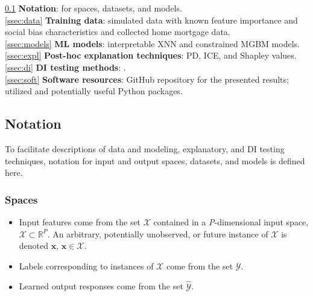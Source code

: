 \documentclass[information,article,submit,moreauthors,pdftex]{definitions/mdpi}
\begin{document}
\vspace{-10pt}
\textsection \ref{ssec:not} \textbf{Notation}: for spaces, datasets, and models.\\
\indent \textsection \ref{ssec:data} \textbf{Training data}: simulated data with known feature importance and social bias characteristics and collected home mortgage data.\\
\indent \textsection \ref{ssec:models} \textbf{ML models}: interpretable XNN and constrained MGBM models.\\
\indent \textsection \ref{ssec:expl} \textbf{Post-hoc explanation techniques}: PD, ICE, and Shapley values.\\
\indent \textsection \ref{ssec:di}  \textbf{DI testing methods}: .\\
\indent \textsection \ref{ssec:soft} \textbf{Software resources}: GitHub repository for the presented results; utilized and potentially useful Python packages.


\subsection{Notation}\label{ssec:not}

To facilitate descriptions of data and modeling, explanatory, and DI testing techniques, notation for input and output spaces, datasets, and models is defined here.

\subsubsection{Spaces} 
 
	\begin{itemize}
		\item Input features come from the set $\mathcal{X}$ contained in a \textit{P}-dimensional input space, $\mathcal{X} \subset \mathbb{R}^P$.  An arbitrary, potentially unobserved, or future instance of $\mathcal{X}$ is denoted $\mathbf{x}$, $\mathbf{x} \in \mathcal{X}$.
		\item Labels corresponding to instances of $\mathcal{X}$ come from the set $\mathcal{Y}$.
		\item Learned output responses come from the set $\mathcal{\hat{Y}}$. %
	\end{itemize}	
	
\end{document}
